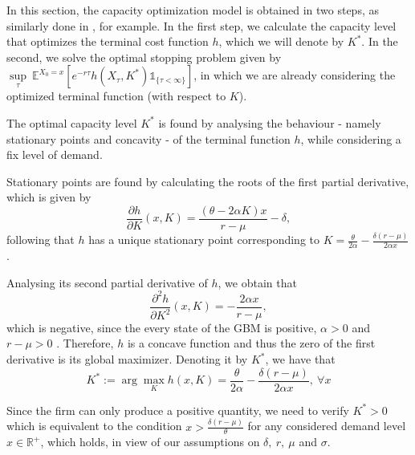 In this section, the capacity optimization model is obtained in two steps, as similarly done in \cite{huis:cap}, for example. In the first step, we calculate the capacity level that optimizes the terminal cost function $h$, which we will denote by $K^*$. In the second, we solve the optimal stopping problem given by $\underset{\tau}{\sup}\ \mathds{E}^{X_0=x}\left[e^{-r\tau}h(X_\tau,K^*) \mathds{1}_{\{\tau<\infty\}} \right]$, in which we are already considering the optimized terminal function (with respect to $K$).

The optimal capacity level $K^*$ is found by analysing the behaviour - namely stationary points and concavity  - of the terminal function $h$, while considering a fix level of demand.

Stationary points are found by calculating the roots of the first partial derivative, which is given by
\begin{equation}
\frac{\partial h }{\partial K}(x,K)=  \frac{(\theta-2\alpha K)x}{r-\mu} - \delta,
\label{1_dK}
\end{equation}
following  that $h$ has a unique stationary point corresponding to
$K=\frac{\theta}{2\alpha}-\frac{\delta (r-\mu)}{2 \alpha x}$.


Analysing its second partial derivative of $h$, we obtain that
\begin{equation}
\frac{\partial^2 h }{\partial K^2}(x,K)=  -\frac{2\alpha x}{r-\mu},
\label{1_d2K}
\end{equation}
which is negative, since the every state of the GBM is positive, $\alpha>0$ and $r-\mu>0$ . Therefore, $h$ is a concave function and 
thus the zero of the first derivative is its global maximizer. Denoting it by $K^*$, we have that
\begin{equation}
K^*:= \arg \max_K h(x,K)=\frac{\theta}{2\alpha}-\frac{\delta (r-\mu)}{2 \alpha x},\ \forall x 
\label{eq:K41}
\end{equation}

Since the firm can only produce a positive quantity, we need to verify $K^* >0 $ which is equivalent to the condition  $x > \frac{\delta(r-\mu)}{\theta} $ for any considered demand level $x \in \mathds{R}^+$, which holds, in view of our assumptions on $\delta, \ r, \ \mu$ and $\sigma$.

